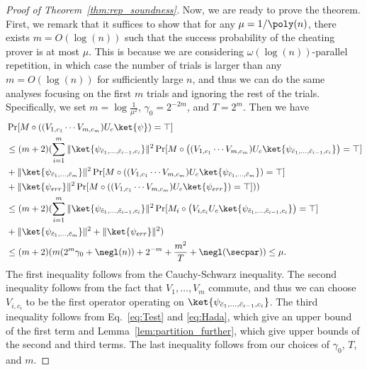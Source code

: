 \begin{proof}[Proof of Theorem~\ref{thm:rep_soundness}]
Now, we are ready to prove the theorem. 
First, we remark that it suffices to show that for any $\mu=1/\poly(n)$, there exists $m=O(\log(n))$ such that the success probability of the cheating prover is at most $\mu$.
This is because we are considering $\omega(\log(n))$-parallel repetition, in which case the number of trials is larger than   any $m=O(\log(n))$ for sufficiently large $n$, and thus we can do the same analyses focusing on  the first $m$ trials and ignoring the rest of the trials.  
Specifically, we set $m = \log \frac{1}{\mu^2}$, $\gamma_0 = 2^{-2m}$, and $T=2^{m}$. Then we have
\begin{align*}
    &\Pr[M\circ\left((V_{1,c_1}\cdots V_{m,c_m})U_c\ket{\psi}\right) = \top] \\
    &\leq (m+2)(\sum_{i=1}^{m} \|\ket{\psi_{\bar{c}_1,\dots,\bar{c}_{i-1},c_i}}\|^2\Pr[M\circ\left((V_{1,c_1}\cdots V_{m,c_m})U_c\ket{\psi_{\bar{c}_1,\dots,\bar{c}_{i-1},c_i}}\right)=\top]\\
    &+\|\ket{\psi_{\bar{c}_1,\dots,\bar{c}_m}}\|^2\Pr[M\circ\left((V_{1,c_1}\cdots V_{m,c_m})U_c\ket{\psi_{\bar{c}_1,\dots,\bar{c}_m}}\right)=\top]\\
    &+ \|\ket{\psi_{err}}\|^2\Pr[M\circ\left((V_{1,c_1}\cdots V_{m,c_m})U_c\ket{\psi_{err}}\right)=\top]))\\
    &\leq (m+2)(\sum_{i=1}^{m} \|\ket{\psi_{\bar{c}_1,\dots,\bar{c}_{i-1},c_i}}\|^2\Pr[M_i\circ\left(V_{i,c_i}U_c\ket{\psi_{\bar{c}_1,\dots,\bar{c}_{i-1},c_i}}\right)=\top]\\
    &+\|\ket{\psi_{\bar{c}_1,\dots,\bar{c}_m}}\|^2+\|\ket{\psi_{err}}\|^2)\\
    &\leq (m+2)(m(2^m\gamma_0 +\negl(n))+ 2^{-m} + \frac{m^2}{T}+\negl(\secpar)) \leq \mu. 
\end{align*}
The first inequality follows from the Cauchy-Schwarz inequality. The second inequality follows from the fact that $V_1,\dots,V_m$ commute, and thus we can choose $V_{i,c_i}$ to be the first operator operating on $\ket{\psi_{\bar{c}_1,\dots,\bar{c}_{i-1},c_{i}}}$.
The third inequality follows from Eq.~\ref{eq:Test} and \ref{eq:Hada}, which give an upper bound of the first term and Lemma~\ref{lem:partition_further}, which give upper bounds of the second and third terms.
The last inequality follows from our choices of $\gamma_0$, $T$, and $m$.
\end{proof}

